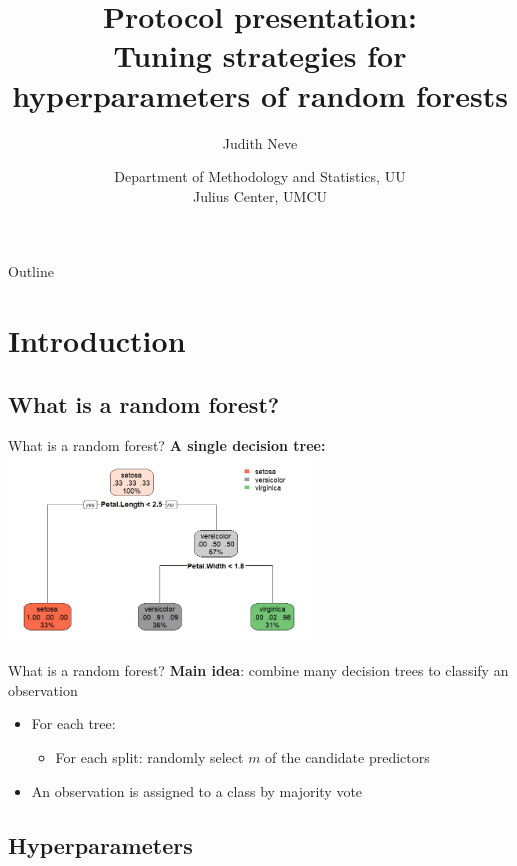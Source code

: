 \documentclass[aspectratio=169]{beamer} %
\title{Protocol presentation:\\Tuning strategies for hyperparameters of random forests}
\author{Judith Neve}
\date{
  Department of Methodology and Statistics, UU\\
  Julius Center, UMCU
}
\begin{document}
  \titlepage

\begin{frame}{Outline}
    \tableofcontents
\end{frame}

\section{Introduction}

\subsection{What is a random forest?}

\begin{frame}{What is a random forest?}
    \textbf{A single decision tree:}\\
    \includegraphics[width = 0.6\textwidth]{Protocol figures/000011.png}
\end{frame}

\begin{frame}{What is a random forest?}
    \textbf{Main idea}: combine many decision trees to classify an observation\\
    \begin{itemize}
        \item For each tree:
        \begin{itemize}
            \item For each split: randomly select $m$ of the candidate predictors
    \end{itemize}
    \item An observation is assigned to a class by majority vote
    \end{itemize}
\end{frame}

\subsection{Hyperparameters}
\end{document}
